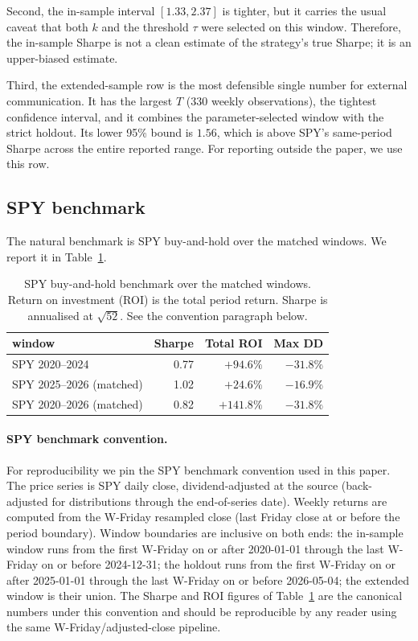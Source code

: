 \documentclass[11pt]{article}
\theoremstyle{definition}
\theoremstyle{remark}
\begin{document}
Second, the in-sample interval $[1.33, 2.37]$ is tighter, but it
carries the usual caveat that both $k$ and the threshold $\tau$
were selected on this window. Therefore, the in-sample Sharpe is
not a clean estimate of the strategy's true Sharpe; it is an
upper-biased estimate.

Third, the extended-sample row is the most defensible single
number for external communication. It has the largest $T$ ($330$
weekly observations), the tightest confidence interval, and it
combines the parameter-selected window with the strict holdout.
Its lower 95\% bound is $1.56$, which is above SPY's same-period
Sharpe across the entire reported range. For reporting outside
the paper, we use this row.

\subsection{SPY benchmark}

The natural benchmark is SPY buy-and-hold over the matched
windows. We report it in Table~\ref{tab:spy}.

\begin{table}[htbp]
\centering
\small
\begin{tabular}{lrrr}
\toprule
window                   & Sharpe & Total ROI & Max DD \\
\midrule
SPY 2020--2024           & 0.77 & $+94.6\%$  & $-31.8\%$ \\
SPY 2025--2026 (matched) & 1.02 & $+24.6\%$  & $-16.9\%$ \\
SPY 2020--2026 (matched) & 0.82 & $+141.8\%$ & $-31.8\%$ \\
\bottomrule
\end{tabular}
\caption{SPY buy-and-hold benchmark over the matched windows.
Return on investment (ROI) is the total period return. Sharpe is
annualised at $\sqrt{52}$. See the convention paragraph below.}
\label{tab:spy}
\end{table}

\paragraph{SPY benchmark convention.}
For reproducibility we pin the SPY benchmark convention used in
this paper. The price series is SPY daily close, dividend-adjusted
at the source (back-adjusted for distributions through the
end-of-series date). Weekly returns are computed from the
W-Friday resampled close (last Friday close at or before the
period boundary). Window boundaries are inclusive on both ends:
the in-sample window runs from the first W-Friday on or after
2020-01-01 through the last W-Friday on or before 2024-12-31; the
holdout runs from the first W-Friday on or after 2025-01-01
through the last W-Friday on or before 2026-05-04; the extended
window is their union. The Sharpe and ROI figures of
Table~\ref{tab:spy} are the canonical numbers under this
convention and should be reproducible by any reader using the same
W-Friday/adjusted-close pipeline.
\end{document}

